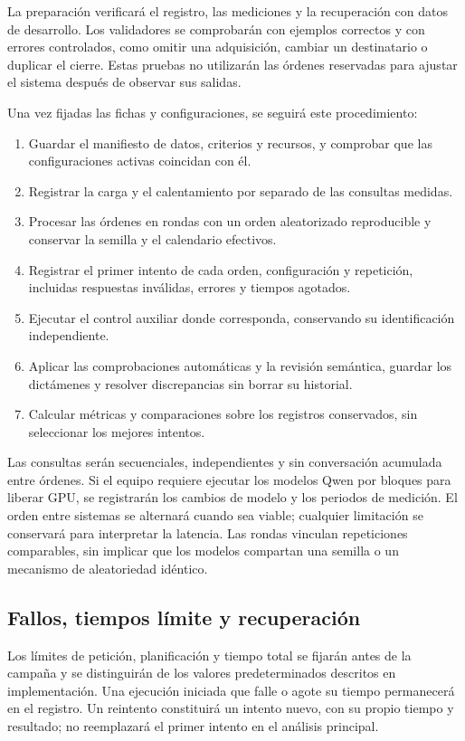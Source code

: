 La preparación verificará el registro, las mediciones y la recuperación
con datos de desarrollo. Los validadores se comprobarán con ejemplos
correctos y con errores controlados, como omitir una adquisición, cambiar
un destinatario o duplicar el cierre. Estas pruebas no utilizarán las
órdenes reservadas para ajustar el sistema después de observar sus salidas.

Una vez fijadas las fichas y configuraciones, se seguirá este procedimiento:

\begin{enumerate}
    \item Guardar el manifiesto de datos, criterios y recursos, y comprobar que las configuraciones activas coincidan con él.
    \item Registrar la carga y el calentamiento por separado de las consultas medidas.
    \item Procesar las órdenes en rondas con un orden aleatorizado reproducible y conservar la semilla y el calendario efectivos.
    \item Registrar el primer intento de cada orden, configuración y repetición, incluidas respuestas inválidas, errores y tiempos agotados.
    \item Ejecutar el control auxiliar donde corresponda, conservando su identificación independiente.
    \item Aplicar las comprobaciones automáticas y la revisión semántica, guardar los dictámenes y resolver discrepancias sin borrar su historial.
    \item Calcular métricas y comparaciones sobre los registros conservados, sin seleccionar los mejores intentos.
\end{enumerate}

Las consultas serán secuenciales, independientes y sin conversación
acumulada entre órdenes. Si el equipo requiere ejecutar los modelos
Qwen por bloques para liberar GPU, se registrarán los cambios de modelo
y los periodos de medición. El orden entre sistemas se alternará cuando
sea viable; cualquier limitación se conservará para interpretar la latencia.
Las rondas vinculan repeticiones comparables, sin implicar que los modelos
compartan una semilla o un mecanismo de aleatoriedad idéntico.

\subsection{Fallos, tiempos límite y recuperación}

Los límites de petición, planificación y tiempo total se fijarán antes
de la campaña y se distinguirán de los valores predeterminados descritos
en implementación. Una ejecución iniciada que falle o agote su tiempo
permanecerá en el registro. Un reintento constituirá un intento nuevo,
con su propio tiempo y resultado; no reemplazará el primer intento en
el análisis principal.


